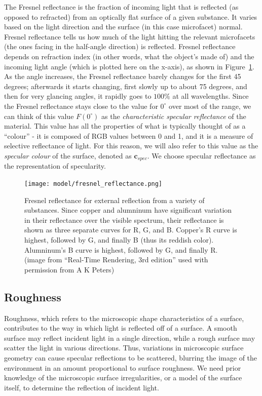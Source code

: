 The Fresnel reflectance is the fraction of incoming light that is reflected (as opposed to refracted) from an optically flat surface of a given substance. It varies based on the light direction and the surface (in this case microfacet) normal. Fresnel reflectance tells us how much of the light hitting the relevant microfacets (the ones facing in the half-angle direction) is reflected. Fresnel reflectance depends on refraction index (in other words, what the object’s made of) and the incoming light angle (which is plotted here on the x-axis), as shown in Figure~\ref{fig:fresnel_reflectance}. As the angle increases, the Fresnel reflectance barely changes for the first 45 degrees; afterwards it starts changing, first slowly up to about 75 degrees, and then for very glancing angles, it rapidly goes to $100\%$ at all wavelengths. Since the Fresnel reflectance stays close to the value for $0^\circ$ over most of the range, we can think of this value $F(0^\circ)$ as the \textit{characteristic specular reflectance} of the material. This value has all the properties of what is typically thought of as a ``colour'' - it is composed of RGB values between 0 and 1, and it is a measure of selective reflectance of light. For this reason, we will also refer to this value as the \textit{specular colour} of the surface, denoted as $\mathbf{c}_{spec}$. We choose specular reflectance as the representation of specularity.
\begin{figure}[!htbp]
\centering
\texttt{[image: model/fresnel\_reflectance.png]}
\caption{Fresnel reflectance for external reflection from a variety of substances. Since copper and alumninum have significant variation in their reflectance over the visible spectrum, their reflectance is shown as three separate curves for R, G, and B. Copper's R curve is highest, followed by G, and finally B (thus its reddish color). Alumninum's B curve is highest, followed by G, and finally R. (image from “Real-Time Rendering, 3rd edition” used with permission from A K Peters)}
\label{fig:fresnel_reflectance}
\end{figure}

\subsection{Roughness}
Roughness, which refers to the microscopic shape characteristics of a surface, contributes to the way in which light is reflected off of a surface. A smooth surface may reflect incident light in a single direction, while a rough surface may scatter the light in various directions. Thus, variations in microscopic surface geometry can cause specular reflections to be scattered, blurring the image of the environment in an amount proportional to surface roughness. We need prior knowledge of the microscopic surface irregularities, or a model of the surface itself, to determine the reflection of incident light.

